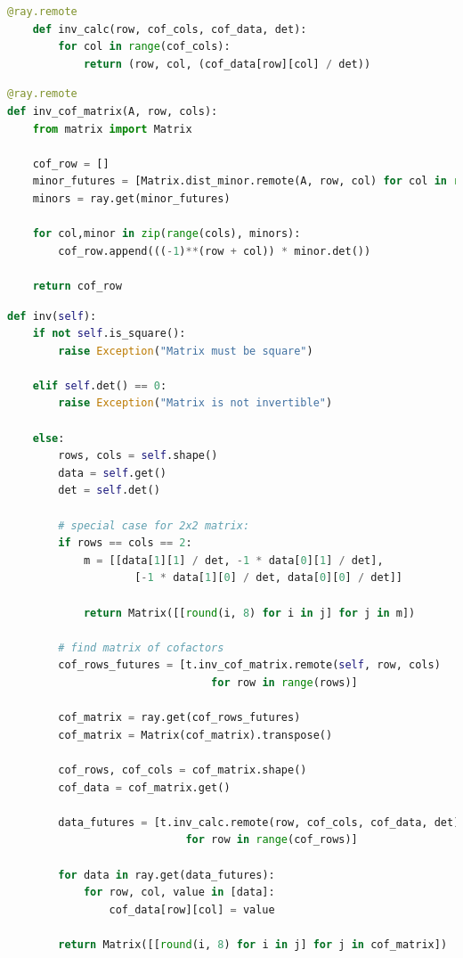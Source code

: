 \begin{lstlisting}[language=Python, caption={inv\_calc}]
    @ray.remote
    def inv_calc(row, cof_cols, cof_data, det):
        for col in range(cof_cols):
            return (row, col, (cof_data[row][col] / det))
    \end{lstlisting}
\pagebreak
\begin{lstlisting}[language=Python, caption={inv\_cof\_matrix}]
@ray.remote
def inv_cof_matrix(A, row, cols):
    from matrix import Matrix
    
    cof_row = []
    minor_futures = [Matrix.dist_minor.remote(A, row, col) for col in range(cols)]
    minors = ray.get(minor_futures)

    for col,minor in zip(range(cols), minors):
        cof_row.append(((-1)**(row + col)) * minor.det())

    return cof_row
\end{lstlisting}
\begin{lstlisting}[language=Python, caption={Parallelized inverse function}]
def inv(self):
    if not self.is_square():
        raise Exception("Matrix must be square")

    elif self.det() == 0:
        raise Exception("Matrix is not invertible")

    else:
        rows, cols = self.shape()
        data = self.get()
        det = self.det()

        # special case for 2x2 matrix:
        if rows == cols == 2:
            m = [[data[1][1] / det, -1 * data[0][1] / det],
                    [-1 * data[1][0] / det, data[0][0] / det]]

            return Matrix([[round(i, 8) for i in j] for j in m])

        # find matrix of cofactors
        cof_rows_futures = [t.inv_cof_matrix.remote(self, row, cols) 
                                for row in range(rows)]
        
        cof_matrix = ray.get(cof_rows_futures)
        cof_matrix = Matrix(cof_matrix).transpose()

        cof_rows, cof_cols = cof_matrix.shape()
        cof_data = cof_matrix.get()

        data_futures = [t.inv_calc.remote(row, cof_cols, cof_data, det) 
                            for row in range(cof_rows)]

        for data in ray.get(data_futures):
            for row, col, value in [data]:
                cof_data[row][col] = value

        return Matrix([[round(i, 8) for i in j] for j in cof_matrix])
\end{lstlisting}
\pagebreak

